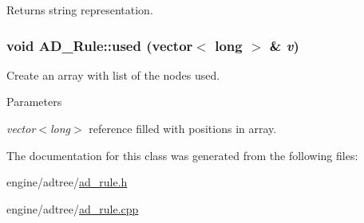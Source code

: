 \begin{DoxyReturn}{Returns}
string representation. 
\end{DoxyReturn}
\hypertarget{classAD__Rule_ab4adf87b03be96137ff952d70a0045fd}{
\subsubsection[{used}]{\setlength{\rightskip}{0pt plus 5cm}void AD\_\-Rule::used (vector$<$ long $>$ \& {\em v})}}
\label{classAD__Rule_ab4adf87b03be96137ff952d70a0045fd}
Create an array with list of the nodes used.


\begin{DoxyParams}{Parameters}
\item[{\em vector$<$long$>$}]reference filled with positions in array. \end{DoxyParams}


The documentation for this class was generated from the following files:\begin{DoxyCompactItemize}
\item 
engine/adtree/\hyperlink{ad__rule_8h}{ad\_\-rule.h}\item 
engine/adtree/\hyperlink{ad__rule_8cpp}{ad\_\-rule.cpp}\end{DoxyCompactItemize}
